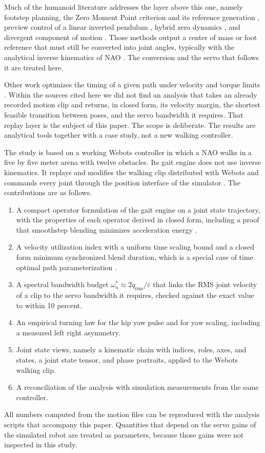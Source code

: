 \documentclass[10pt,journal]{IEEEtran}
\begin{document}
Much of the humanoid literature addresses the layer above this one, namely footstep planning, the Zero Moment Point criterion and its reference generation \cite{vukobratovic2004,erbatur2009}, preview control of a linear inverted pendulum \cite{kajita2003,kajita2010}, hybrid zero dynamics \cite{westervelt2003}, and divergent component of motion \cite{englsberger2015}. Those methods output a center of mass or foot reference that must still be converted into joint angles, typically with the analytical inverse kinematics of NAO \cite{kofinas2015}. The conversion and the servo that follows it are treated here.

Other work optimizes the timing of a given path under velocity and torque limits \cite{bobrow1985,pham2018}. Within the sources cited here we did not find an analysis that takes an already recorded motion clip and returns, in closed form, its velocity margin, the shortest feasible transition between poses, and the servo bandwidth it requires. That replay layer is the subject of this paper. The scope is deliberate. The results are analytical tools together with a case study, not a new walking controller.

The study is based on a working Webots controller in which a NAO walks in a five by five meter arena with twelve obstacles. Its gait engine does not use inverse kinematics. It replays and modifies the walking clip distributed with Webots and commands every joint through the position interface of the simulator \cite{michel2004}. The contributions are as follows.
\begin{enumerate}
\item A compact operator formulation of the gait engine on a joint state trajectory, with the properties of each operator derived in closed form, including a proof that smoothstep blending minimizes acceleration energy \cite{flash1985}.
\item A velocity utilization index with a uniform time scaling bound and a closed form minimum synchronized blend duration, which is a special case of time optimal path parameterization \cite{bobrow1985,pham2018}.
\item A spectral bandwidth budget $\omega_n^{*}\approx2\dot q_{\mathrm{rms}}/\varepsilon$ that links the RMS joint velocity of a clip to the servo bandwidth it requires, checked against the exact value to within 10 percent.
\item An empirical turning law for the hip yaw pulse and for yaw scaling, including a measured left right asymmetry.
\item Joint state views, namely a kinematic chain with indices, roles, axes, and states, a joint state tensor, and phase portraits, applied to the Webots walking clip.
\item A reconciliation of the analysis with simulation measurements from the same controller.
\end{enumerate}
All numbers computed from the motion files can be reproduced with the analysis scripts that accompany this paper. Quantities that depend on the servo gains of the simulated robot are treated as parameters, because those gains were not inspected in this study.
\end{document}
